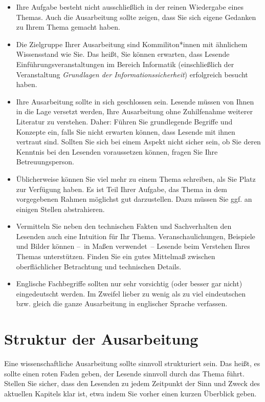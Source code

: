 \begin{itemize}
\item Ihre Aufgabe besteht nicht ausschließlich in der reinen Wiedergabe eines Themas. Auch die
  Ausarbeitung sollte zeigen, dass Sie sich eigene Gedanken zu Ihrem Thema gemacht haben.
\item Die Zielgruppe Ihrer Ausarbeitung sind Kommiliton*innen mit ähnlichem Wissensstand wie Sie. Das
  heißt, Sie können erwarten, dass Lesende Einführungsveranstaltungen im Bereich Informatik
  (einschließlich der Veranstaltung \emph{Grundlagen der Informationssicherheit}) erfolgreich
  besucht haben.
\item Ihre Ausarbeitung sollte in sich geschlossen sein.  Lesende müssen von Ihnen in die Lage
  versetzt werden, Ihre Ausarbeitung ohne Zuhilfenahme weiterer Literatur zu verstehen. Daher:
  Führen Sie grundlegende Begriffe und Konzepte ein, falls Sie nicht erwarten können, dass Lesende
  mit ihnen vertraut sind. Sollten Sie sich bei einem Aspekt nicht sicher sein, ob Sie deren Kenntnis
  bei den Lesenden voraussetzen können, fragen Sie Ihre Betreuungsperson.
\item Üblicherweise können Sie viel mehr zu einem Thema schreiben, als Sie Platz zur Verfügung
  haben. Es ist Teil Ihrer Aufgabe, das Thema in dem vorgegebenen Rahmen möglichst gut
  darzustellen. Dazu müssen Sie ggf. an einigen Stellen abstrahieren.
\item Vermitteln Sie neben den technischen Fakten und Sachverhalten den Lesenden auch eine Intuition
  für Ihr Thema. Veranschaulichungen, Beispiele und Bilder können --~in Maßen verwendet~-- Lesende
  beim Verstehen Ihres Themas unterstützen.  Finden Sie ein gutes Mittelmaß zwischen oberflächlicher
  Betrachtung und technischen Details.
\item Englische Fachbegriffe sollten nur sehr vorsichtig (oder besser gar nicht) eingedeutscht
  werden. Im Zweifel lieber zu wenig als zu viel eindeutschen bzw. gleich die ganze Ausarbeitung in
  englischer Sprache verfassen.
\end{itemize}

\section{Struktur der Ausarbeitung}
Eine wissenschaftliche Ausarbeitung sollte sinnvoll strukturiert sein. Das heißt, es sollte einen
roten Faden geben, der Lesende sinnvoll durch das Thema führt. Stellen Sie sicher, dass den Lesenden
zu jedem Zeitpunkt der Sinn und Zweck des aktuellen Kapitels klar ist, etwa indem Sie vorher einen
kurzen Überblick geben.

